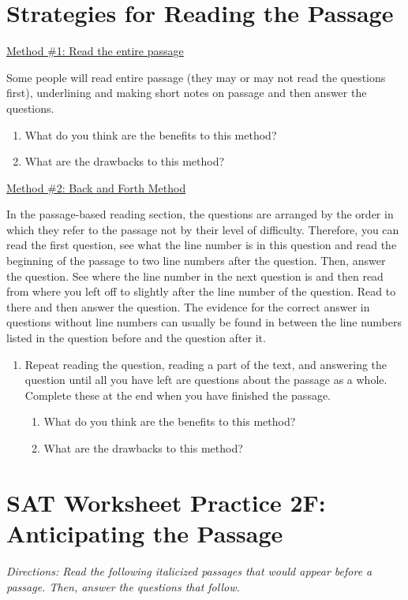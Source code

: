 \documentclass[12pt]{book}
\begin{document}
\newpage
\section[Reading the Passage]{Strategies for Reading the Passage}

\underline{Method \#1: Read the entire passage}

Some people will read entire passage (they may or may not read the questions first), underlining and making short notes on passage and then answer the questions. 

\bigskip
\begin{enumerate}
\item What do you think are the benefits to this method?
\vfill\item What are the drawbacks to this method?
\end{enumerate}


\vfill
\underline{Method \#2: Back and Forth Method}

In the passage-based reading section, the questions are arranged by the order in which they refer to the passage not by their level of difficulty. Therefore, you can read the first question, see what the line number is in this question and read the beginning of the passage to two line numbers after the question. Then, answer the question. See where the line number in the next question is and then read from where you left off to slightly after the line number of the question. Read to there and then answer the question. The evidence for the correct answer in questions without line numbers can usually be found in between the line numbers listed in the question before and the question after it. 

\begin{enumerate}
\item Repeat reading the question, reading a part of the text, and answering the question until all you have left are questions about the passage as a whole. Complete these at the end when you have finished the passage. 

\vfill
\begin{enumerate}
\item What do you think are the benefits to this method?
\vfill\item What are the drawbacks to this method?
\end{enumerate}
\end{enumerate}

\vfill
\newpage

\section[Anticipating the Passage]{SAT Worksheet Practice 2F: Anticipating the Passage}
\textit{Directions: Read the following italicized passages that would appear before a passage. Then, answer the questions that follow.}
\end{document}
